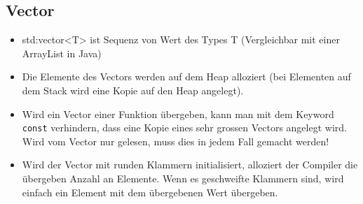 \subsection{Vector}
\begin{itemize}
	\item std:vector<T> ist Sequenz von Wert des Types T (Vergleichbar mit einer ArrayList in Java)
	\item Die Elemente des Vectors werden auf dem Heap alloziert (bei Elementen auf dem Stack wird eine Kopie auf den Heap angelegt).
	\item Wird ein Vector einer Funktion übergeben, kann man mit dem Keyword \lstinline|const| verhindern, dass eine Kopie eines sehr grossen Vectors angelegt wird. Wird vom Vector nur gelesen, muss dies in jedem Fall gemacht werden!
	\item Wird der Vector mit runden Klammern initialisiert, alloziert der Compiler die übergeben Anzahl an Elemente. Wenn es geschweifte Klammern sind, wird einfach ein Element mit dem übergebenen Wert übergeben.
\end{itemize}
